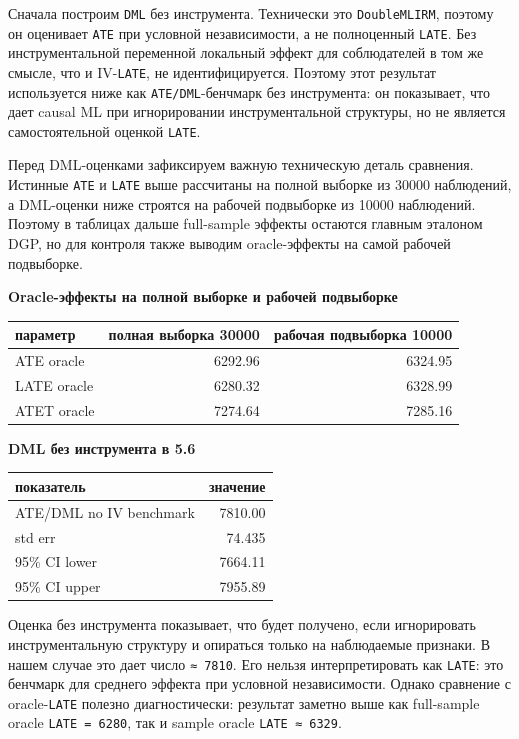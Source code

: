 \documentclass[11pt]{article}
\newcounter{none}
\begin{document}
Сначала построим \texttt{DML} без инструмента. Технически это
\texttt{DoubleMLIRM}, поэтому он оценивает \texttt{ATE} при условной
независимости, а не полноценный \texttt{LATE}. Без инструментальной
переменной локальный эффект для соблюдателей в том же смысле, что и
IV-\texttt{LATE}, не идентифицируется. Поэтому этот результат
используется ниже как \texttt{ATE/DML}-бенчмарк без инструмента: он
показывает, что дает causal ML при игнорировании инструментальной
структуры, но не является самостоятельной оценкой \texttt{LATE}.

    Перед DML-оценками зафиксируем важную техническую деталь сравнения.
Истинные \texttt{ATE} и \texttt{LATE} выше рассчитаны на полной выборке
из 30000 наблюдений, а DML-оценки ниже строятся на рабочей подвыборке из
10000 наблюдений. Поэтому в таблицах дальше full-sample эффекты остаются
главным эталоном DGP, но для контроля также выводим oracle-эффекты на
самой рабочей подвыборке.

    \textbf{Oracle-эффекты на полной выборке и рабочей подвыборке}

{\def\LTcaptype{none} %
\begin{longtable}[]{@{}lrr@{}}
\toprule\noalign{}
параметр & полная выборка 30000 & рабочая подвыборка 10000 \\
\midrule\noalign{}
\endhead
\bottomrule\noalign{}
\endlastfoot
ATE oracle & 6292.96 & 6324.95 \\
LATE oracle & 6280.32 & 6328.99 \\
ATET oracle & 7274.64 & 7285.16 \\
\end{longtable}
}

    \textbf{DML без инструмента в 5.6}

{\def\LTcaptype{none} %
\begin{longtable}[]{@{}lr@{}}
\toprule\noalign{}
показатель & значение \\
\midrule\noalign{}
\endhead
\bottomrule\noalign{}
\endlastfoot
ATE/DML no IV benchmark & 7810.00 \\
std err & 74.435 \\
95\% CI lower & 7664.11 \\
95\% CI upper & 7955.89 \\
\end{longtable}
}

    Оценка без инструмента показывает, что будет получено, если игнорировать
инструментальную структуру и опираться только на наблюдаемые признаки. В
нашем случае это дает число \texttt{≈\ 7810}. Его нельзя
интерпретировать как \texttt{LATE}: это бенчмарк для среднего эффекта
при условной независимости. Однако сравнение с oracle-\texttt{LATE}
полезно диагностически: результат заметно выше как full-sample oracle
\texttt{LATE\ =\ 6280}, так и sample oracle \texttt{LATE\ ≈\ 6329}.
\end{document}
